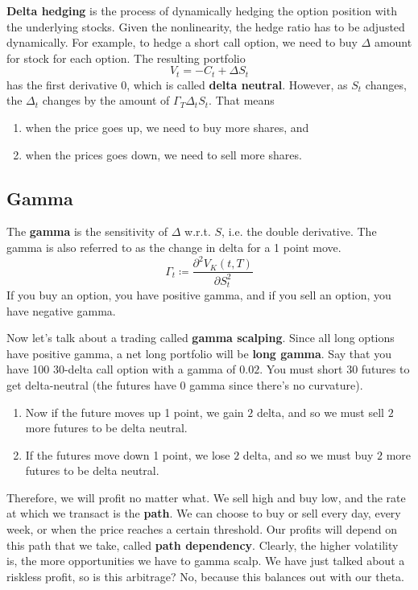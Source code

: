 \documentclass{article}
\begin{document}
    \begin{definition}
      \textbf{Delta hedging} is the process of dynamically hedging the option position with the underlying stocks. Given the nonlinearity, the hedge ratio has to be adjusted dynamically. For example, to hedge a short call option, we need to buy $\Delta$ amount for stock for each option. The resulting portfolio 
      \begin{equation}
        V_t = -C_t + \Delta S_t
      \end{equation}
      has the first derivative $0$, which is called \textbf{delta neutral}. However, as $S_t$ changes, the $\Delta_t$ changes by the amount of $\Gamma_T \Delta_t S_t$. That means 
      \begin{enumerate}
        \item when the price goes up, we need to buy more shares, and 
        \item when the prices goes down, we need to sell more shares. 
      \end{enumerate}
    \end{definition}

  \subsection{Gamma}

    \begin{definition}[Gamma]
      The \textbf{gamma} is the sensitivity of $\Delta$ w.r.t. $S$, i.e. the double derivative. The gamma is also referred to as the change in delta for a 1 point move. 
      \begin{equation}
        \Gamma_t \coloneqq \frac{\partial^2 V_K (t, T)}{\partial S_t^2}
      \end{equation}
      If you buy an option, you have positive gamma, and if you sell an option, you have negative gamma.
    \end{definition}

    Now let's talk about a trading called \textbf{gamma scalping}. Since all long options have positive gamma, a net long portfolio will be \textbf{long gamma}. Say that you have 100 $30$-delta call option with a gamma of $0.02$.
    You must short $30$ futures to get delta-neutral (the futures have $0$ gamma since there's no curvature).
    \begin{enumerate}
      \item Now if the future moves up 1 point, we gain $2$ delta, and so we must sell $2$ more futures to be delta neutral.
      \item If the futures move down 1 point, we lose $2$ delta, and so we must buy $2$ more futures to be delta neutral.
    \end{enumerate}
    Therefore, we will profit no matter what. We sell high and buy low, and the rate at which we transact is the \textbf{path}.
    We can choose to buy or sell every day, every week, or when the price reaches a certain threshold.
    Our profits will depend on this path that we take, called \textbf{path dependency}. Clearly, the higher volatility is, the more opportunities we have to gamma scalp. We have just talked about a riskless profit, so is this arbitrage? No, because this balances out with our theta.
\end{document}
